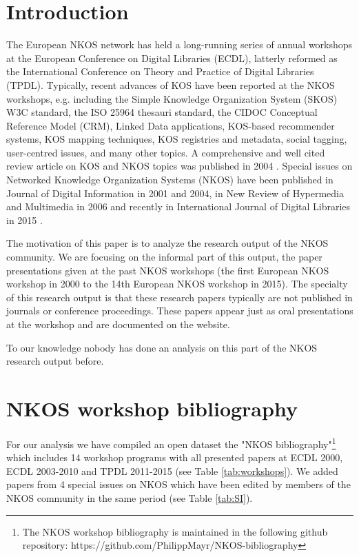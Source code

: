 \documentclass[runningheads,a4paper]{llncs}
\begin{document}
\section{Introduction}\label{intro}

The European NKOS network has held a long-running series of annual workshops at the European Conference on Digital Libraries (ECDL), latterly reformed as the International Conference on Theory and Practice of Digital Libraries (TPDL). 
Typically, recent advances of KOS have been reported at the NKOS workshops, e.g. including the Simple Knowledge Organization System (SKOS) W3C standard, the ISO 25964 thesauri standard, the CIDOC Conceptual Reference Model (CRM), Linked Data applications, KOS-based recommender systems, KOS mapping techniques, KOS registries and metadata, social tagging, user-centred issues, and many other topics. A comprehensive and well cited review article on KOS and NKOS topics was published in 2004 \cite{Zeng2004}. Special issues on Networked Knowledge Organization Systems (NKOS) have been published in Journal of Digital Information in 2001 and 2004, in New Review of Hypermedia and Multimedia in 2006 and recently in International Journal of Digital Libraries in 2015 \cite{Mayr2016}. 

The motivation of this paper is to analyze the research output of the NKOS community. We are focusing on the informal part of this output, the paper presentations given at the past NKOS workshops (the first European NKOS workshop in 2000 to the 14th European NKOS workshop in 2015). The specialty of this research output is that these research papers typically are not published in journals or conference proceedings. These papers appear just as oral presentations at the workshop and are documented on the website. 

To our knowledge nobody has done an analysis on this part of the NKOS research output before. 


\section{NKOS workshop bibliography}\label{dataset}

For our analysis we have compiled an open dataset the "NKOS bibliography"\footnote{The NKOS workshop bibliography is maintained in the following github repository: https://github.com/PhilippMayr/NKOS-bibliography} which includes 14 workshop programs with all presented papers at ECDL 2000, ECDL 2003-2010 and TPDL 2011-2015 (see Table \ref{tab:workshops}). We added papers from 4 special issues on NKOS which have been edited by members of the NKOS community in the same period (see Table \ref{tab:SI}). 
\end{document}

